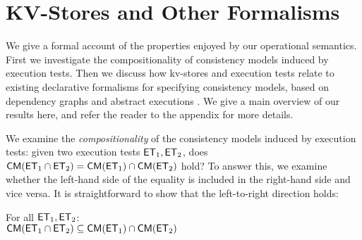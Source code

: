 \newcommand{\execs}{\ensuremath{\mathsf{Execs}}}

\section{KV-Stores and Other Formalisms}
\label{sec:other_formalisms}

We give a formal account of the properties enjoyed by our operational 
semantics. First we investigate the compositionality of consistency models 
induced by execution tests. Then we discuss how kv-stores and execution 
tests relate to existing  declarative formalisms for specifying  
consistency models, based on dependency graphs \cite{adya} 
and abstract executions \cite{framework-concur}. 
We give a main overview of our results here, and refer the reader to the 
appendix for more details.


We examine the \emph{compositionality} of the  consistency models induced by execution tests:  
\ie given two execution tests $\mathsf{ET}_1, \mathsf{ET}_2$, does 
$\mathsf{CM}(\mathsf{ET}_1 \cap \mathsf{ET}_2) = \mathsf{CM}(\mathsf{ET}_1) \cap \mathsf{CM}(\mathsf{ET}_2)$ hold? 
To answer this, we examine whether the left-hand side of the equality is included in the right-hand side and vice versa. 
It is straightforward to show that the left-to-right direction holds: 
\begin{proposition}
\label{prop:composite_stronger}
For all $\mathsf{ET}_1, \mathsf{ET}_2$:\\ 
\indent\qquad $\mathsf{CM}(\mathsf{ET}_1 \cap \mathsf{ET}_2) \subseteq \mathsf{CM}(\mathsf{ET}_1) \cap \mathsf{CM}(\mathsf{ET}_2)$
\end{proposition}

